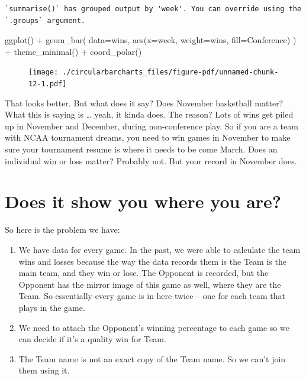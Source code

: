 \documentclass[
  letterpaper,
  DIV=11,
  numbers=noendperiod]{scrreprt}
\newenvironment{Shaded}{\begin{snugshade}}{\end{snugshade}}
\newcommand{\AttributeTok}[1]{\textcolor[rgb]{0.40,0.45,0.13}{#1}}
\newcommand{\FunctionTok}[1]{\textcolor[rgb]{0.28,0.35,0.67}{#1}}
\newcommand{\NormalTok}[1]{\textcolor[rgb]{0.00,0.23,0.31}{#1}}
\newcommand{\SpecialCharTok}[1]{\textcolor[rgb]{0.37,0.37,0.37}{#1}}
\providecommand{\tightlist}{%
  \setlength{\itemsep}{0pt}\setlength{\parskip}{0pt}}\usepackage{longtable,booktabs,array}
\begin{document}
\begin{verbatim}
`summarise()` has grouped output by 'week'. You can override using the
`.groups` argument.
\end{verbatim}

\begin{Shaded}
\begin{Highlighting}[]
\FunctionTok{ggplot}\NormalTok{() }\SpecialCharTok{+} 
  \FunctionTok{geom\_bar}\NormalTok{(}
    \AttributeTok{data=}\NormalTok{wins, }
    \FunctionTok{aes}\NormalTok{(}\AttributeTok{x=}\NormalTok{week, }\AttributeTok{weight=}\NormalTok{wins, }\AttributeTok{fill=}\NormalTok{Conference)}
\NormalTok{    ) }\SpecialCharTok{+} 
  \FunctionTok{theme\_minimal}\NormalTok{() }\SpecialCharTok{+} 
  \FunctionTok{coord\_polar}\NormalTok{()}
\end{Highlighting}
\end{Shaded}

\begin{figure}[H]

{\centering \texttt{[image: ./circularbarcharts\_files/figure-pdf/unnamed-chunk-12-1.pdf]}

}

\end{figure}

That looks better. But what does it say? Does November basketball
matter? What this is saying is \ldots{} yeah, it kinda does. The reason?
Lots of wins get piled up in November and December, during
non-conference play. So if you are a team with NCAA tournament dreams,
you need to win games in November to make sure your tournament resume is
where it needs to be come March. Does an individual win or loss matter?
Probably not. But your record in November does.

\hypertarget{does-it-show-you-where-you-are}{%
\section{Does it show you where you
are?}\label{does-it-show-you-where-you-are}}

So here is the problem we have:

\begin{enumerate}
\def\labelenumi{\arabic{enumi}.}
\tightlist
\item
  We have data for every game. In the past, we were able to calculate
  the team wins and losses because the way the data records them is the
  Team is the main team, and they win or lose. The Opponent is recorded,
  but the Opponent has the mirror image of this game as well, where they
  are the Team. So essentially every game is in here twice -- one for
  each team that plays in the game.
\item
  We need to attach the Opponent's winning percentage to each game so we
  can decide if it's a quality win for Team.
\item
  The Team name is not an exact copy of the Team name. So we can't join
  them using it.
\end{enumerate}
\end{document}
